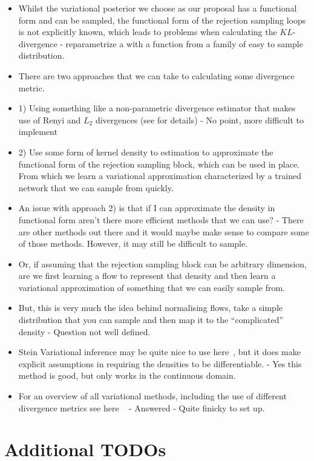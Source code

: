 \documentclass{article}
\begin{document}
\begin{itemize}
  \item Whilst the variational posterior we choose as our proposal has a functional form  
  and can be sampled, the functional form of the rejection sampling loops is not explicitly known,
  which leads to problems when calculating the $KL$-divergence - reparametrize a with a function from a family of easy to sample distribution. 
  \item There are two approaches that we can take to calculating some divergence metric. 
  \item 1) Using something like a non-parametric divergence estimator that makes use of Renyi and $L_{2}$ divergences (see \cite{basseville2013divergence} for details) - No point, more difficult to implement
  \item 2) Use some form of kernel density to estimation to approximate the functional form of the rejection sampling 
  block, which can be used in place. From which we learn a variational approximation characterized by a trained network that we can sample from quickly. 
  \item An issue with approach 2) is that if I can approximate the density in functional form aren't there more efficient methods that we can use? - There are other methods out there and it would maybe make sense to compare some of those methods. However, it may still be difficult to sample. 
  \item Or, if assuming that the rejection sampling block can be arbitrary dimension, are we first learning a flow to represent that density and then learn a variational approximation of something that we can easily sample from. 
  \item But, this is very much the idea behind normalising flows, take a simple distribution that you can sample and then map it to the ``complicated'' density - Question not well defined. 
  \item Stein Variational inference may be quite nice to use here~\cite{feng2017learning}, but it does make explicit assumptions in requiring the densities to be differentiable. - Yes this method is good, but only works in the continuous domain. 
  \item  For an overview of all variational methods, including the use of different divergence metrics see here ~\cite{8588399} - Answered - Quite finicky to set up. 
\end{itemize}

\section{Additional TODOs}
\end{document}
